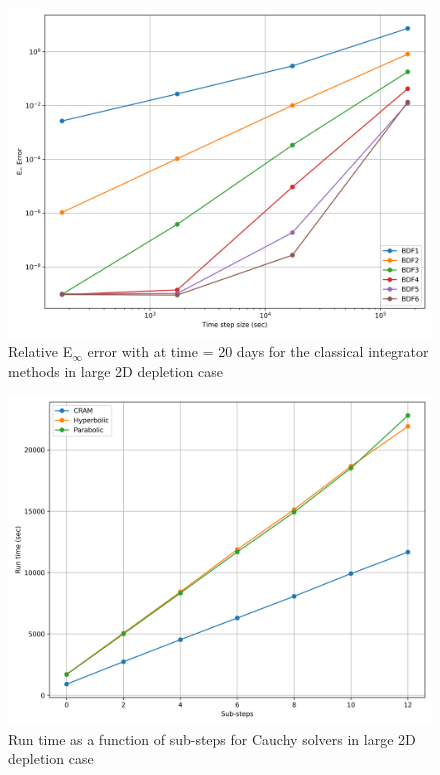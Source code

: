 \begin{figure}[p]
    \centering
    \includegraphics[width=5in]{images/chapter-5/caseStudies/large2DDepletion/msrLarge2DDepletionEinfErrorerrorIntegrators.png}
    \caption{Relative E$_{\infty}$ error with at time = 20 days for the classical integrator methods in large 2D depletion case}
    \label{fig:large_2D_depletion_Einf_integrators}
\end{figure}

\clearpage

\begin{figure}[p]
    \centering
    \includegraphics[width=5in]{images/chapter-5/caseStudies/large2DDepletion/msr2DDepletionLargeCauchyRuntimes.png}
    \caption{Run time as a function of sub-steps for Cauchy solvers in large 2D depletion case}
    \label{fig:large_2D_depletion_Cauchy_runtimes}
\end{figure}

